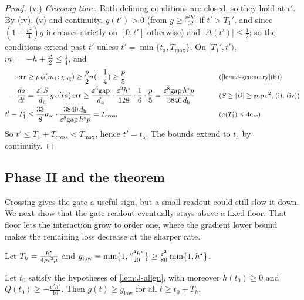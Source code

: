 \begin{proof}
\noindent(vi) \emph{Crossing time.} Both defining conditions are closed, so they hold at $t'$. By (iv), (v) and continuity, $g(t')>0$ (from
$g\ge\frac{v^2h^\star}{32}$ if $t'>T_1'$, and since $(1+\frac{v^2}{4})g$ increases strictly on $[0,t']$ otherwise) and $|\Delta(t')|\le\frac{1}{2}$; so the
conditions extend past $t'$ unless $t'=\min\{t_{\mathrm a},T_{\max}\}$. On $[T_1',t')$, $m_1=-h+\frac{\Delta}{2}\le\frac{1}{4}$, and
\begin{alignat*}{2}
 \mathrm{err}&\ge p\,\phi(m_1;\cbg)\ge\tfrac{p}{2}\sigma(-\tfrac{1}{4})\ge\tfrac{p}{5} &\qquad& \why{\cref{lem:J-geometry}(b)}\\
 -\ddt{a}&=\frac{\initscale^4S}{d_{\mathrm h}}\,g\,\sigma'(a)\,\mathrm{err}\ge\frac{\initscale^6\mathrm{gap}}{d_{\mathrm h}}\cdot\frac{\initscale^2h^\star}{128}\cdot\frac{1}{6}\cdot\frac{p}{5}
 =\frac{\initscale^8\mathrm{gap}\,h^\star p}{3840\,d_{\mathrm h}} && \why{$S\ge|D|\ge\mathrm{gap}\,\initscale^2$, (i), (iv)}\\
 t'-T_1'&\le\frac{33}{8}a_{\mathrm{sc}}\cdot\frac{3840\,d_{\mathrm h}}{\initscale^8\mathrm{gap}\,h^\star p}=T_{\mathrm{cross}} && \why{$a(T_1')\le4a_{\mathrm{sc}}$}
\end{alignat*}
So $t'\le T_1+T_{\mathrm{cross}}<T_{\max}$, hence $t'=t_{\mathrm a}$. The bounds extend to $t_{\mathrm a}$ by continuity.
\end{proof}

\subsection{Phase II and the theorem}

Crossing gives the gate a useful sign, but a small readout could still slow it down. We next show that the gate readout eventually
stays above a fixed floor. That floor lets the interaction grow to order one, where the gradient lower bound makes the remaining
loss decrease at the sharper rate.

Let $T_h=\frac{h^\star}{4\rho\varepsilon^2\mu}$ and $g_{\mathrm{low}}=\min\{1,\frac{v^2h^\star}{20}\}\ge\frac{\varepsilon^2}{80}\min\{1,h^\star\}$.

\begin{lemma}
\label{lem:J-floor}
Let $t_0$ satisfy the hypotheses of \cref{lem:J-align}, with moreover $h(t_0)\ge0$ and $Q(t_0)\ge-\frac{v^2h^\star}{16}$. Then $g(t)\ge g_{\mathrm{low}}$ for all
$t\ge t_0+T_h$.
\end{lemma}

